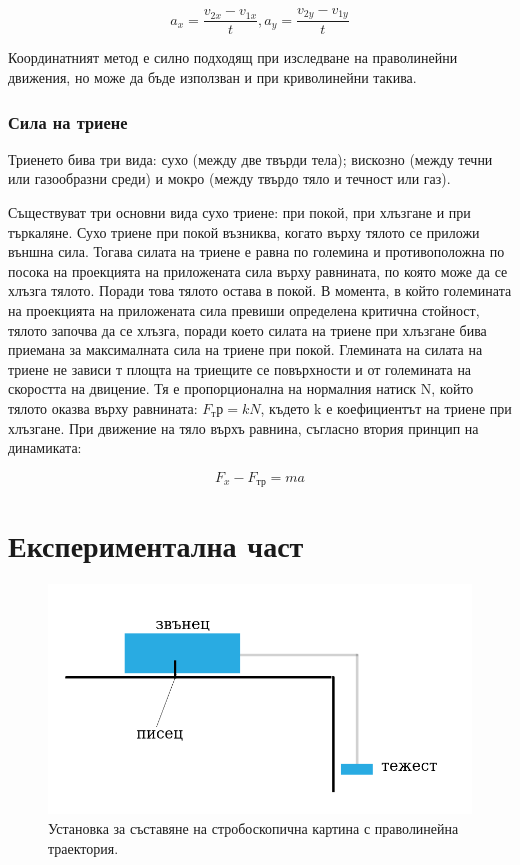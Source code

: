 \documentclass[12pt]{article}
\begin{document}
\begin{equation}\label{eq:a_coordinate_method}
a_{x} = \frac{v_{2x} - v_{1x}}{t}, a_{y} = \frac{v_{2y} - v_{1y}}{t}
\end{equation}

Координатният метод е силно подходящ при изследване на праволинейни движения, но може да бъде използван и при криволинейни такива.

\subsubsection{Сила на триене}
Триенето бива три вида: сухо (между две твърди тела); вискозно (между течни или газообразни среди) и мокро (между твърдо тяло и течност или газ).

Съществуват три основни вида сухо триене: при покой, при хлъзгане и при търкаляне. Сухо триене при покой възниква, когато върху тялото се приложи външна сила. Тогава силата на триене е равна по големина и противоположна по посока на проекцията на приложената сила върху равнината, по която може да се хлъзга тялото. Поради това тялото остава в покой. В момента, в който големината на проекцията на приложената сила превиши определена критична стойност, тялото започва да се хлъзга, поради което силата на триене при хлъзгане бива приемана за максималната сила на триене при покой. Глемината на силата на триене не зависи т площта на триещите се повърхности и от големината на скоростта на двицение. Тя е пропорционална на нормалния натиск N, който тялото оказва върху равнината: \(F_тр = kN\), където k е коефициентът на триене при хлъзгане. При движение на тяло върхъ равнина, съгласно втория принцип на динамиката: 

\begin{equation}
F_x - F_{тр} = ma
\end{equation}


\section{Експериментална част}
\begin{figure}
\centering
\includegraphics[width=1\textwidth]{images/bell_scheme.png}
\caption{\label{fig:linear-setup} Установка за съставяне на стробоскопична картина с праволинейна траектория.}
\end{figure}
\end{document}
